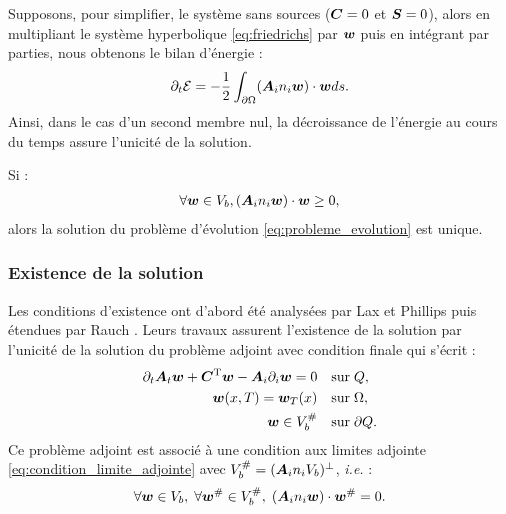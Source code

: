 Supposons, pour simplifier, le système sans sources ($\bm{C} = 0$ et $\bm{S} = 0$), alors
en multipliant le système hyperbolique \eqref{eq:friedrichs} par $\bm{w}$ puis en
intégrant par parties, nous obtenons le bilan d'énergie :
\begin{align}
	\partial_{t} \mathcal{E} =
	- \frac{1}{2} \int_{\partial\Omega} ({\bm{A}_{i}n_{i}} \bm{w}) \cdot \bm{w} ds .
\end{align}
Ainsi, dans le cas d'un second membre nul, la décroissance de l'énergie au cours
du temps assure l'unicité de la solution.

\begin{theorem} \label{thm:unicite}
	Si :
	\begin{align}
		\forall \bm{w} \in V_b , ({\bm{A}_{i}n_{i}} \bm{w}) \cdot \bm{w} \ge 0 ,
	\end{align}
	alors la solution du problème d'évolution \eqref{eq:probleme_evolution} est unique.
\end{theorem}


\subsubsection{Existence de la solution}
\label{sssect:pb_evol_existence}

Les conditions d’existence ont d’abord été analysées par Lax et Phillips \cite{existence_solution_lax_phillips} puis étendues par Rauch \cite{existence_solution_rauch}. Leurs travaux assurent l’existence de la solution
par l’unicité de la solution du problème adjoint avec condition finale qui s’écrit :
\begin{subequations}
	\begin{align}
		\partial_{t} \bm{A}_{t} \bm{w} + \bm{C}^{\mathrm{T}} \bm{w} - {\bm{A}_{i}\partial_{i}} \bm{w} = 0
		&\quad \mathrm{sur} \; Q ,
		\\
		\bm{w} (x, T) = \bm{w}_T (x)
		&\quad \mathrm{sur} \; \Omega ,
		\\
		\bm{w} \in V_b^{\#}
		&\quad \mathrm{sur} \; \partial Q
		\label{eq:condition_limite_adjointe} .
	\end{align}
	\label{eq:probleme_evolution_inverse}
\end{subequations}
Ce problème adjoint est associé à une condition aux limites adjointe
\eqref{eq:condition_limite_adjointe} avec $V_b^{\#} =
({\bm{A}_{i}n_{i}} V_b)^\perp$, \textit{i.e.} :
\begin{align}
	\forall \bm{w} \in V_b, \;
	\forall \bm{w}^{\#} \in V_b^{\#}, \;
	({\bm{A}_{i}n_{i}} \bm{w}) \cdot \bm{w}^{\#} = 0 .
\end{align}

